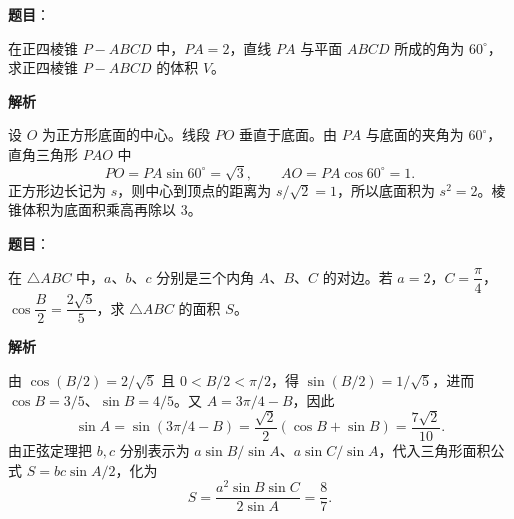 \begin{answer}

\textbf{题目}：

在正四棱锥 $P-ABCD$ 中，$PA=2$，直线 $PA$ 与平面 $ABCD$ 所成的角为 $60^\circ$，求正四棱锥 $P-ABCD$ 的体积 $V$。
\nopagebreak[4]
\begin{center}\end{center}
\nopagebreak[4]
\textbf{解析}

设 $O$ 为正方形底面的中心。线段 $PO$ 垂直于底面。由 $PA$ 与底面的夹角为 $60^\circ$，直角三角形 $PAO$ 中
\nopagebreak[4]
\[
PO=PA\sin60^\circ=\sqrt3,\qquad AO=PA\cos60^\circ=1.
\]
正方形边长记为 $s$，则中心到顶点的距离为 $s/\sqrt2=1$，所以底面积为 $s^2=2$。棱锥体积为底面积乘高再除以 $3$。


\end{answer}
\begin{answer}

\textbf{题目}：

在 $\triangle ABC$ 中，$a$、$b$、$c$ 分别是三个内角 $A$、$B$、$C$ 的对边。若 $a=2$，$C=\dfrac{\pi}{4}$，$\cos\dfrac{B}{2}=\dfrac{2\sqrt{5}}{5}$，求 $\triangle ABC$ 的面积 $S$。

\textbf{解析}

由 $\cos(B/2)=2/\sqrt5$ 且 $0<B/2<\pi/2$，得 $\sin(B/2)=1/\sqrt5$，进而 $\cos B=3/5$、$\sin B=4/5$。又 $A=3\pi/4-B$，因此
\nopagebreak[4]
\[
\sin A=\sin(3\pi/4-B)=\frac{\sqrt2}{2}(\cos B+\sin B)=\frac{7\sqrt2}{10}.
\]
由正弦定理把 $b,c$ 分别表示为 $a\sin B/\sin A$、$a\sin C/\sin A$，代入三角形面积公式 $S=bc\sin A/2$，化为
\nopagebreak[4]
\[
S=\frac{a^2\sin B\sin C}{2\sin A}=\frac87.
\]


\end{answer}
